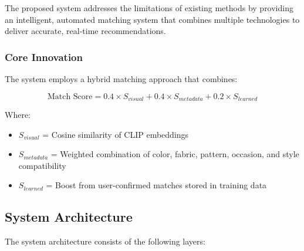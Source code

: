 \documentclass[12pt,a4paper]{report}
\begin{document}
The proposed system addresses the limitations of existing methods by providing an intelligent, automated matching system that combines multiple technologies to deliver accurate, real-time recommendations.

\subsubsection{Core Innovation}

The system employs a hybrid matching approach that combines:

\begin{equation}
\text{Match Score} = 0.4 \times S_{visual} + 0.4 \times S_{metadata} + 0.2 \times S_{learned}
\end{equation}

Where:
\begin{itemize}
    \item $S_{visual}$ = Cosine similarity of CLIP embeddings
    \item $S_{metadata}$ = Weighted combination of color, fabric, pattern, occasion, and style compatibility
    \item $S_{learned}$ = Boost from user-confirmed matches stored in training data
\end{itemize}

\subsection{System Architecture}

The system architecture consists of the following layers:
\end{document}
